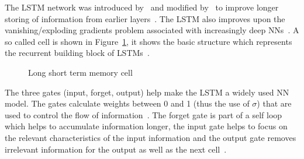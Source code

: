 The \ac{LSTM} network was introduced by~\cite{hochreiter_long_1997} and modified
by~\cite{gers_learning_1999} to improve longer storing of information from earlier
layers~\citep{chauhan_review_2018}.
The \ac{LSTM} also improves upon the vanishing/exploding gradients problem associated with
increasingly deep \acp{NN}~\citep{sherstinsky_fundamentals_2020}.
A so called cell is shown in Figure~\ref{fig:lstm}, it shows the basic structure which represents
the recurrent building block of \acp{LSTM}~\citep{goodfellow_deep_2016}.
\begin{figure}[ht]
    \centering
    
    \caption{Long short term memory cell~\citep{goodfellow_deep_2016,yu_review_2019}\label{fig:lstm}}
\end{figure}
The three gates (input, forget, output) help make the \ac{LSTM} a widely used \ac{NN} model.
The gates calculate weights between 0 and 1 (thus the use of $\sigma$) that are used to control
the flow of information~\citep{goodfellow_deep_2016}.
The forget gate is part of a self loop which helps to accumulate information longer, the input
gate helps to focus on the relevant characteristics of the input information
and the output gate removes irrelevant information for the output as well as the next
cell~\citep{goodfellow_deep_2016}.

